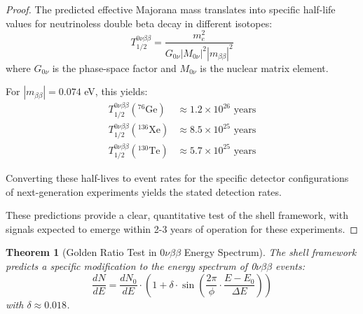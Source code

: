 \documentclass[12pt,a4paper]{article}
\newtheorem{theorem}{Theorem}[section]
\begin{document}
    \begin{proof}
    The predicted effective Majorana mass translates into specific half-life values for neutrinoless double beta decay in different isotopes:
    \begin{equation}
    T_{1/2}^{0\nu\beta\beta} = \frac{m_e^2}{G_{0\nu} |M_{0\nu}|^2 |m_{\beta\beta}|^2}
    \end{equation}
    where $G_{0\nu}$ is the phase-space factor and $M_{0\nu}$ is the nuclear matrix element.
    
    For $|m_{\beta\beta}| = 0.074$ eV, this yields:
    \begin{align}
    T_{1/2}^{0\nu\beta\beta}(^{76}\text{Ge}) &\approx 1.2 \times 10^{26} \text{ years} \\
    T_{1/2}^{0\nu\beta\beta}(^{136}\text{Xe}) &\approx 8.5 \times 10^{25} \text{ years} \\
    T_{1/2}^{0\nu\beta\beta}(^{130}\text{Te}) &\approx 5.7 \times 10^{25} \text{ years}
    \end{align}
    
    Converting these half-lives to event rates for the specific detector configurations of next-generation experiments yields the stated detection rates.
    
    These predictions provide a clear, quantitative test of the shell framework, with signals expected to emerge within 2-3 years of operation for these experiments.
    \end{proof}
    
    \begin{theorem}[Golden Ratio Test in 0$\nu\beta\beta$ Energy Spectrum]
    \label{thm:spectrum-test}
    The shell framework predicts a specific modification to the energy spectrum of 0$\nu\beta\beta$ events:
    \begin{equation}
    \frac{dN}{dE} = \frac{dN_0}{dE} \cdot \left(1 + \delta \cdot \sin\left(\frac{2\pi}{\phi} \cdot \frac{E-E_0}{\Delta E}\right)\right)
    \end{equation}
    with $\delta \approx 0.018$.
    \end{theorem}
    
\end{document}

